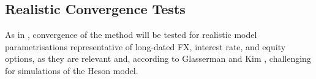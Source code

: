 \documentclass[12,twoside]{mammeTFM}
\theoremstyle{definition}
\theoremstyle{remark}
\begin{document}


\subsection{Realistic Convergence Tests}
As in \cite{cui17}, convergence of the method will be tested for realistic model parametrisations representative of long-dated FX, interest rate, and equity options, as they are relevant and, according to Glasserman and Kim \cite{gla11}, challenging for simulations of the Heson model.




\end{document}
